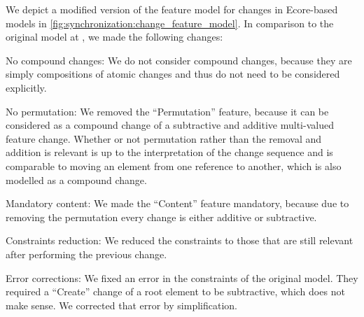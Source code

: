 We depict a modified version of the feature model for changes in Ecore-based models in \autoref{fig:synchronization:change_feature_model}.
In comparison to the original model at \cite[Fig. 5.3]{kramer2017a}, we made the following changes:
\begin{properdescription}
    \item[No compound changes:] We do not consider compound changes, because they are simply compositions of atomic changes and thus do not need to be considered explicitly.
    \item[No permutation:] We removed the \enquote{Permutation} feature, because it can be considered as a compound change of a subtractive and additive multi-valued feature change. Whether or not permutation rather than the removal and addition is relevant is up to the interpretation of the change sequence and is comparable to moving an element from one reference to another, which is also modelled as a compound change.
    \item[Mandatory content:] We made the \enquote{Content} feature mandatory, because due to removing the permutation every change is either additive or subtractive.
    \item[Constraints reduction:] We reduced the constraints to those that are still relevant after performing the previous change.
    \item[Error corrections:] We fixed an error in the constraints of the original model. They required a \enquote{Create} change of a root element to be subtractive, which does not make sense. We corrected that error by simplification.
\end{properdescription}

